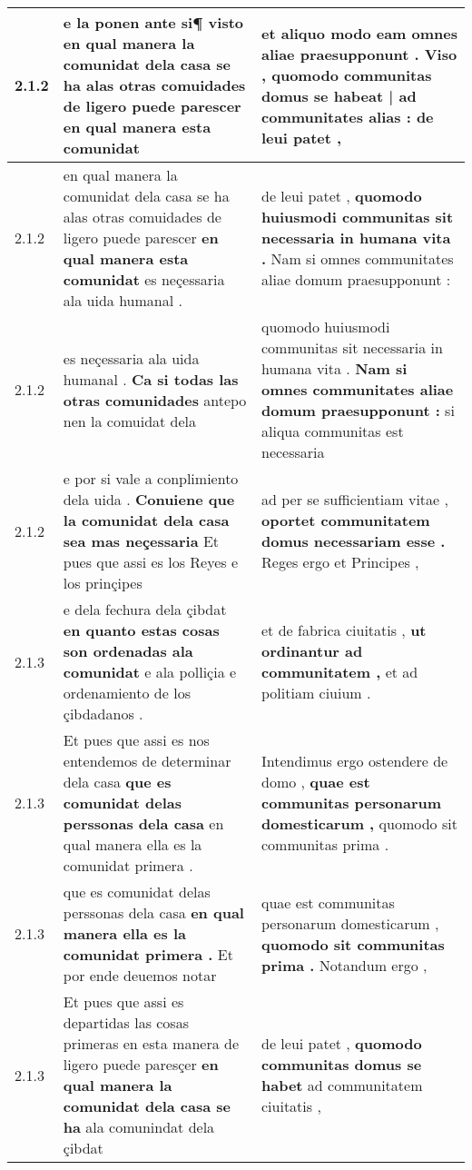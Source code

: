 \begin{tabular}{|p{1cm}|p{6.5cm}|p{6.5cm}|}
2.1.2 & e la ponen ante si¶ visto \textbf{ en qual manera la comunidat dela casa se ha alas otras comuidades de ligero puede parescer } en qual manera esta comunidat & et aliquo modo eam omnes aliae praesupponunt . \textbf{ Viso , quomodo communitas domus se habeat | ad communitates alias : } de leui patet , \\\hline
2.1.2 & en qual manera la comunidat dela casa se ha alas otras comuidades de ligero puede parescer \textbf{ en qual manera esta comunidat } es neçessaria ala uida humanal . & de leui patet , \textbf{ quomodo huiusmodi communitas sit necessaria in humana vita . } Nam si omnes communitates aliae domum praesupponunt : \\\hline
2.1.2 & es neçessaria ala uida humanal . \textbf{ Ca si todas las otras comunidades } antepo nen la comuidat dela & quomodo huiusmodi communitas sit necessaria in humana vita . \textbf{ Nam si omnes communitates aliae domum praesupponunt : } si aliqua communitas est necessaria \\\hline
2.1.2 & e por si vale a conplimiento dela uida . \textbf{ Conuiene que la comunidat dela casa sea mas neçessaria } Et pues que assi es los Reyes e los prinçipes & ad per se sufficientiam vitae , \textbf{ oportet communitatem domus necessariam esse . } Reges ergo et Principes , \\\hline
2.1.3 & e dela fechura dela çibdat \textbf{ en quanto estas cosas son ordenadas ala comunidat } e ala polliçia e ordenamiento de los çibdadanos . & et de fabrica ciuitatis , \textbf{ ut ordinantur ad communitatem , } et ad politiam ciuium . \\\hline
2.1.3 & Et pues que assi es nos entendemos de determinar dela casa \textbf{ que es comunidat delas perssonas dela casa } en qual manera ella es la comunidat primera . & Intendimus ergo ostendere de domo , \textbf{ quae est communitas personarum domesticarum , } quomodo sit communitas prima . \\\hline
2.1.3 & que es comunidat delas perssonas dela casa \textbf{ en qual manera ella es la comunidat primera . } Et por ende deuemos notar & quae est communitas personarum domesticarum , \textbf{ quomodo sit communitas prima . } Notandum ergo , \\\hline
2.1.3 & Et pues que assi es departidas las cosas primeras en esta manera de ligero puede paresçer \textbf{ en qual manera la comunidat dela casa se ha } ala comunindat dela çibdat & de leui patet , \textbf{ quomodo communitas domus se habet } ad communitatem ciuitatis , \\\hline

\end{tabular}
